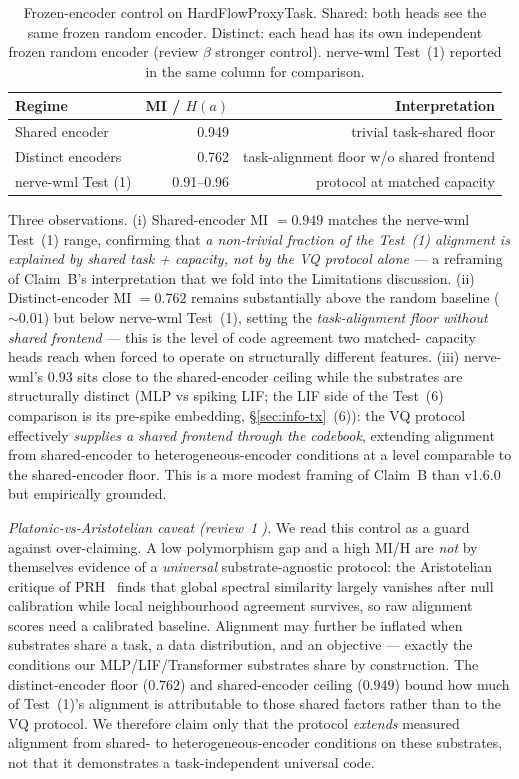 \documentclass[10pt,twocolumn]{article}
\begin{document}
\begin{table}[t]
  \centering
  \caption{Frozen-encoder control on HardFlowProxyTask. Shared:
  both heads see the same frozen random encoder. Distinct: each
  head has its own independent frozen random encoder (review
  $\beta$ stronger control). nerve-wml Test~(1) reported in the
  same column for comparison.}
  \label{tab:frozen-baseline}
  \small
  \begin{tabular}{lrr}
    \hline
    Regime & MI / $H(a)$ & Interpretation \\
    \hline
    Shared encoder      & 0.949 & trivial task-shared floor \\
    Distinct encoders   & 0.762 & task-alignment floor w/o shared frontend \\
    nerve-wml Test (1)  & 0.91--0.96 & protocol at matched capacity \\
    \hline
  \end{tabular}
\end{table}

Three observations. (i) Shared-encoder MI $=0.949$ matches the
nerve-wml Test~(1) range, confirming that \emph{a non-trivial
fraction of the Test~(1) alignment is explained by shared task +
capacity, not by the VQ protocol alone} --- a reframing of
Claim~B's interpretation that we fold into the Limitations
discussion. (ii) Distinct-encoder MI $=0.762$ remains substantially
above the random baseline ($\sim 0.01$) but below nerve-wml
Test~(1), setting the \emph{task-alignment floor without shared
frontend} --- this is the level of code agreement two matched-
capacity heads reach when forced to operate on structurally
different features. (iii) nerve-wml's $0.93$ sits close to the
shared-encoder ceiling while the substrates are structurally
distinct (MLP vs spiking LIF; the LIF side of the Test~(6) comparison is its
pre-spike embedding, \S\ref{sec:info-tx}~(6)): the VQ protocol effectively
\emph{supplies a shared frontend through the codebook}, extending
alignment from shared-encoder to heterogeneous-encoder conditions
at a level comparable to the shared-encoder floor. This is a more
modest framing of Claim~B than v1.6.0 but empirically grounded.

\emph{Platonic-vs-Aristotelian caveat (review~\textcircled{1}).} We read this control as a
guard against over-claiming. A low polymorphism gap and a high MI/H are \emph{not} by
themselves evidence of a \emph{universal} substrate-agnostic protocol: the Aristotelian
critique of PRH~\cite{aristotelianprh2026} finds that global spectral similarity largely
vanishes after null calibration while local neighbourhood agreement survives, so raw
alignment scores need a calibrated baseline. Alignment may further be inflated when
substrates share a task, a data distribution, and an objective --- exactly the conditions
our MLP/LIF/Transformer substrates share by construction. The distinct-encoder floor ($0.762$) and shared-encoder
ceiling ($0.949$) bound how much of Test~(1)'s alignment is attributable to those shared
factors rather than to the VQ protocol. We therefore claim only that the protocol
\emph{extends} measured alignment from shared- to heterogeneous-encoder conditions on these
substrates, not that it demonstrates a task-independent universal code.
\end{document}
